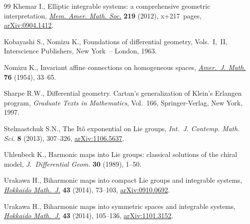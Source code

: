 \begin{thebibliography}{99}
Khemar I., Elliptic integrable systems: a comprehensive geometric
  interpretation, \href{http://dx.doi.org/10.1090/S0065-9266-2012-00651-4}{\textit{Mem. Amer. Math. Soc.}} \textbf{219} (2012), x+217~pages,
  \href{http://arxiv.org/abs/0904.1412}{arXiv:0904.1412}.

Kobayashi S., Nomizu K., Foundations of dif\/ferential geometry,
  {V}ols.~{I},~{II}, Interscience Publishers, New York~-- London, 1963.

Nomizu K., Invariant af\/f\/ine connections on homogeneous spaces, \href{http://dx.doi.org/10.2307/2372398}{\textit{Amer.~J.
  Math.}} \textbf{76} (1954), 33--65.

Sharpe R.W., Dif\/ferential geometry. Cartan's generalization of Klein's Erlangen
  program, \textit{Graduate Texts in Mathematics}, Vol.~166, Springer-Verlag,
  New York, 1997.

Stelmastchuk S.N., The {I}t\^o exponential on {L}ie groups, \textit{Int.~J.
  Contemp. Math. Sci.} \textbf{8} (2013), 307--326, \href{http://arxiv.org/abs/1106.5637}{arXiv:1106.5637}.

Uhlenbeck K., Harmonic maps into {L}ie groups: classical solutions of the
  chiral model, \textit{J.~Differential Geom.} \textbf{30} (1989), 1--50.

Urakawa H., Biharmonic maps into compact {L}ie groups and integrable systems,
  \href{http://dx.doi.org/10.14492/hokmj/1392906095}{\textit{Hokkaido Math.~J.}} \textbf{43} (2014), 73--103, \href{http://arxiv.org/abs/0910.0692}{arXiv:0910.0692}.

Urakawa H., Biharmonic maps into symmetric spaces and integrable systems,
  \href{http://dx.doi.org/10.14492/hokmj/1392906096}{\textit{Hokkaido Math.~J.}} \textbf{43} (2014), 105--136, \href{http://arxiv.org/abs/1101.3152}{arXiv:1101.3152}.

\end{thebibliography}
